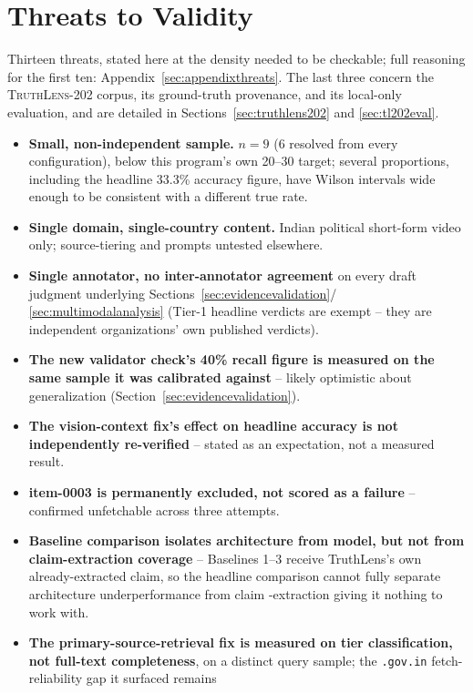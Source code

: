 \documentclass[conference]{IEEEtran}
\begin{document}
\section{Threats to Validity}
\label{sec:threats}
Thirteen threats, stated here at the density needed to be checkable; full
reasoning for the first ten: Appendix~\ref{sec:appendixthreats}. The last
three concern the \textsc{TruthLens-202} corpus, its ground-truth
provenance, and its local-only evaluation, and are detailed in
Sections~\ref{sec:truthlens202} and \ref{sec:tl202eval}.

\begin{itemize}
\item \textbf{Small, non-independent sample.} $n=9$ (6 resolved from
  every configuration), below this program's own 20--30 target; several
  proportions, including the headline 33.3\% accuracy figure, have
  Wilson intervals wide enough to be consistent with a different true
  rate.
\item \textbf{Single domain, single-country content.} Indian political
  short-form video only; source-tiering and prompts untested elsewhere.
\item \textbf{Single annotator, no inter-annotator agreement} on every
  draft judgment underlying Sections~\ref{sec:evidencevalidation}/
  \ref{sec:multimodalanalysis} (Tier-1 headline verdicts are exempt --
  they are independent organizations' own published verdicts).
\item \textbf{The new validator check's 40\% recall figure is measured
  on the same sample it was calibrated against} -- likely optimistic
  about generalization (Section~\ref{sec:evidencevalidation}).
\item \textbf{The vision-context fix's effect on headline accuracy is
  not independently re-verified} -- stated as an expectation, not a
  measured result.
\item \textbf{item-0003 is permanently excluded, not scored as a
  failure} -- confirmed unfetchable across three attempts.
\item \textbf{Baseline comparison isolates architecture from model, but
  not from claim-extraction coverage} -- Baselines 1--3 receive
  TruthLens's own already-extracted claim, so the headline comparison
  cannot fully separate architecture underperformance from claim
  -extraction giving it nothing to work with.
\item \textbf{The primary-source-retrieval fix is measured on tier
  classification, not full-text completeness}, on a distinct query
  sample; the \texttt{.gov.in} fetch-reliability gap it surfaced remains

\end{itemize}
\end{document}
